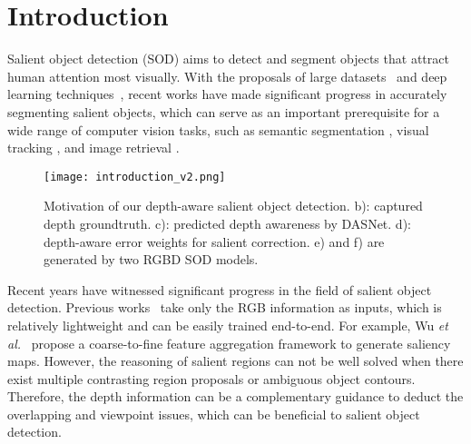 \documentclass[sigconf]{acmart}
\def\etal{{\em et al.}}
\begin{document}


\maketitle

\section{Introduction}

Salient object detection (SOD) aims to detect and segment objects that attract human attention most visually. With the proposals of large datasets~\cite{ju2014depth,peng2014rgbd,niu2012leveraging,yan2013hierarchical,li2015visual,wang2017learning} and deep learning techniques~\cite{he2016deep,long2015fully}, recent works have made significant progress in accurately segmenting salient objects,
which can serve as an important prerequisite for a wide range of computer vision tasks, such as semantic segmentation \cite{lai2016saliency}, visual tracking \cite{hong2015online}, and image retrieval \cite{shao2006specific}. 



\begin{figure}[t]
	\begin{center}
\texttt{[image: introduction\_v2.png]}
		\caption{Motivation of our depth-aware salient object detection. b): captured depth groundtruth. c): predicted depth awareness by DASNet. d): depth-aware error weights for salient correction. e) and f) are generated by two RGBD SOD models.
		}\label{fig:motivation}
	\end{center}
\end{figure}

Recent years have witnessed significant progress in the field of salient object detection. Previous works~\cite{cheng2014global,yan2013hierarchical,klein2011center,liu2018picanet,F3Net,wu2019cascaded,zhao2019pyramid,su2019selectivity,qin2019basnet} take only the RGB information as inputs, which is relatively lightweight and can be easily trained end-to-end. For example, Wu \etal ~\cite{wu2019cascaded} propose a coarse-to-fine feature aggregation framework to generate saliency maps.
However, the reasoning of salient regions can not be well solved when there exist multiple contrasting region proposals or ambiguous object contours. Therefore, the depth information can be a complementary guidance to deduct the overlapping and viewpoint issues, which can be beneficial to salient object detection.
\end{document}
